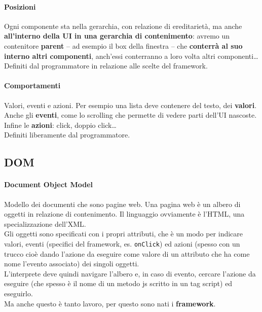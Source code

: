 \documentclass[10pt]{article}
\begin{document}
\paragraph{Posizioni} Ogni componente sta nella gerarchia, con relazione di ereditarietà, ma anche \textbf{all'interno della UI in una gerarchia di contenimento}: avremo un contenitore \textbf{parent} -- ad esempio il box della finestra -- che \textbf{conterrà al suo interno altri componenti}, anch'essi conterranno a loro volta altri componenti\ldots\\
Definiti dal programmatore in relazione alle scelte del framework.
\paragraph{Comportamenti} Valori, eventi e azioni. Per esempio una lista deve contenere del testo, dei \textbf{valori}. Anche gli \textbf{eventi}, come lo scrolling che permette di vedere parti dell'UI nascoste. Infine le \textbf{azioni}: click, doppio click\ldots\\
Definiti liberamente dal programmatore.
\subsection{DOM}
\paragraph{Document Object Model} Modello dei documenti che sono pagine web. Una pagina web è un albero di oggetti in relazione di contenimento. Il linguaggio ovviamente è l'HTML, una specializzazione dell'XML.\\
Gli oggetti sono specificati con i propri attributi, che è un modo per indicare valori, eventi (specifici del framework, es. \texttt{onClick}) ed azioni (spesso con un trucco cioè dando l'azione da eseguire come valore di un attributo che ha come nome l'evento associato) dei singoli oggetti.\\
L'interprete deve quindi navigare l'albero e, in caso di evento, cercare l'azione da eseguire (che spesso è il nome di un metodo js scritto in un tag script) ed eseguirlo.\\
Ma anche questo è tanto lavoro, per questo sono nati i \textbf{framework}.
\end{document}
